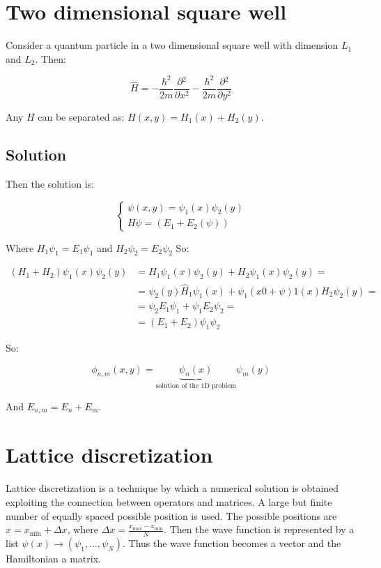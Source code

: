 \section{Two dimensional square well}
Consider a quantum particle in a two dimensional square well with dimension $L_1$ and $L_2$.
Then:

$$\hat{H} = -\frac{\hbar^2}{2m}\frac{\partial {^2}}{\partial {x^2}}-\frac{\hbar^2}{2m}\frac{\partial {^2}}{\partial {y^2}}$$

Any $H$ can be separated as: $H(x,y) = H_1(x) + H_2(y)$.

  \subsection{Solution}
  Then the solution is:

  $$\begin{cases}\psi(x,y) = \psi_1(x)\psi_2(y)\\H\psi=(E_1+E_2(\psi))\end{cases}$$

  Where $H_1\psi_1 = E_1\psi_1$  and $H_2\psi_2 = E_2\psi_2$
  So:

  \begin{align*}
    (H_1 + H_2)\psi_1(x)\psi_2(y) &= H_1\psi_1(x)\psi_2(y) + H_2\psi_1(x)\psi_2(y)=\\
                                  &= \psi_2(y)\hat{H}_1\psi_1(x)+\psi_1(x0+\psi)1(x)H_2\psi_2(y)=\\
                                  &= \psi_2 E_1\psi_1 + \psi_1E_2\psi_2=\\
                                  &=(E_1+E_2)\psi_1\psi_2
  \end{align*}

  So:

  $$\phi_{n,m}(x,y) = \underbrace{\psi_n(x)}_{\text{solution of the 1D problem}}\psi_m(y)$$

  And $E_{n,m} = E_n+E_m$.

\section{Lattice discretization}
Lattice discretization is a technique by which a numerical solution is obtained exploiting the connection between operators and matrices.
A large but finite number of equally spaced possible position is used.
The possible positions are $x = x_{\min} + \Delta x$, where $\Delta x = \frac{x_{\max}-x_{\min}}{N}$.
Then the wave function is represented by a list $\psi(x) \rightarrow(\psi_1,\dots, \psi_N)$.
Thus the wave function becomes  a vector and the Hamiltonian a matrix.

